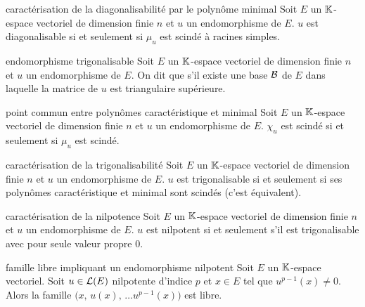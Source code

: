 \begin{adjustwidth}{-3cm}{-3cm}
\begin{theoreme}{7.9}{caractérisation de la diagonalisabilité par le polynôme minimal}
    Soit $E$ un $\mathbb{K}$-espace vectoriel de dimension finie $n$ et $u$ un endomorphisme de $E$. $u$ est diagonalisable si et seulement si $\mu_u$ est scindé à racines simples.
\end{theoreme}

\begin{definition}{7.14}{endomorphisme trigonalisable}
    Soit $E$ un $\mathbb{K}$-espace vectoriel de dimension finie $n$ et $u$ un endomorphisme de $E$. On dit que  s'il existe une base $\mathcal{B}$ de $E$ dans laquelle la matrice de $u$ est triangulaire supérieure.
\end{definition}

\begin{proposition}{7.17}{point commun entre polynômes caractéristique et minimal}
    Soit $E$ un $\mathbb{K}$-espace vectoriel de dimension finie $n$ et $u$ un endomorphisme de $E$. $\chi_u$ est scindé si et seulement si $\mu_u$ est scindé.
\end{proposition}

\begin{theoreme}{7.18}{caractérisation de la trigonalisabilité}
    Soit $E$ un $\mathbb{K}$-espace vectoriel de dimension finie $n$ et $u$ un endomorphisme de $E$. $u$ est trigonalisable si et seulement si ses polynômes caractéristique et minimal sont scindés (c'est équivalent).
\end{theoreme}

\begin{proposition}{7.31}{caractérisation de la nilpotence}
    Soit $E$ un $\mathbb{K}$-espace vectoriel de dimension finie $n$ et $u$ un endomorphisme de $E$. $u$ est nilpotent si et seulement s'il est trigonalisable avec pour seule valeur propre $0$.
\end{proposition}

\begin{proposition}{7.32}{famille libre impliquant un endomorphisme nilpotent}
    Soit $E$ un $\mathbb{K}$-espace vectoriel. Soit $u \in \mathcal{L}(E)$ nilpotente d'indice $p$ et $x \in E$ tel que $u^{p-1}(x) \neq 0$. Alors la famille $\big(x,\, u(x),\, \dots u^{p-1}(x)\big)$ est libre.
\end{proposition}   


\end{adjustwidth}
